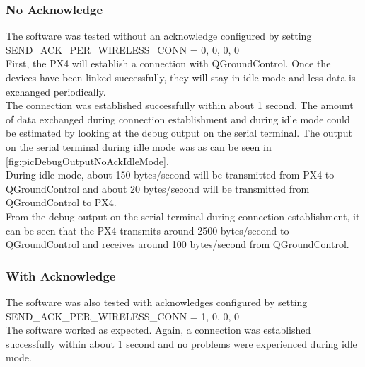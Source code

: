 \subsubsection{No Acknowledge}
%
The software was tested without an acknowledge configured by setting SEND\_ACK\_PER\_WIRELESS\_CONN = 0, 0, 0, 0\\
First, the PX4 will establish a connection with QGroundControl. Once the devices have been linked successfully, they will stay in idle mode and less data is exchanged periodically.\\
The connection was established successfully within about 1 second. The amount of data exchanged during connection establishment and during idle mode could be estimated by looking at the debug output on the serial terminal. The output on the serial terminal during idle mode was as can be seen in \autoref{fig:picDebugOutputNoAckIdleMode}. \\
During idle mode, about 150 bytes/second will be transmitted from PX4 to QGroundControl and about 20 bytes/second will be transmitted from QGroundControl to PX4.\\
From the debug output on the serial terminal during connection establishment, it can be seen that the PX4 transmits around 2500 bytes/second to QGroundControl and receives around 100 bytes/second from QGroundControl.
%
\subsubsection{With Acknowledge}
The software was also tested with acknowledges configured by setting SEND\_ACK\_PER\_WIRELESS\_CONN = 1, 0, 0, 0\\
The software worked as expected. Again, a connection was established successfully within about 1 second and no problems were experienced during idle mode.
%
%
%
%

